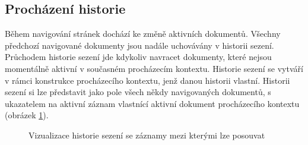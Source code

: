 \subsection{Procházení historie}
\label{Chapter.Implementation.TraversingHistory}

Během navigování stránek dochází ke změně aktivních dokumentů. Všechny předchozí navigované dokumenty jsou nadále uchovávány v historii sezení. Průchodem historie sezení jde kdykoliv navracet dokumenty, které nejsou momentálně aktivní v současném procházecím kontextu. Historie sezení se vytváří v rámci konstrukce procházecího kontextu, jenž danou historii vlastní. Historii sezení si lze představit jako pole všech někdy navigovaných dokumentů, s ukazatelem na aktivní záznam vlastnící aktivní dokument procházecího kontextu (obrázek \ref{Figure.SessionHistory}).

\begin{figure}[H]
  \begin{center}
    \caption{Vizualizace historie sezení se záznamy mezi kterými lze posouvat}
    \label{Figure.SessionHistory}
  \end{center}
\end{figure}

